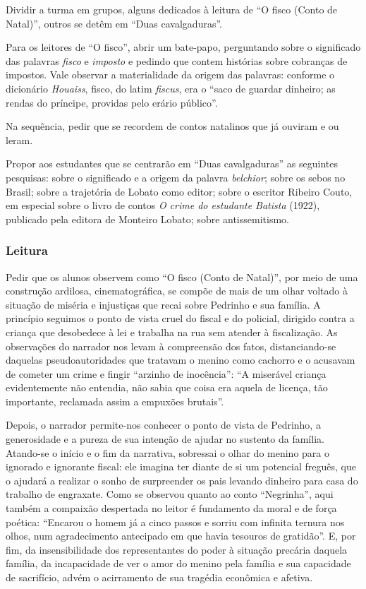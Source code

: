\documentclass[11pt]{extarticle}
\begin{document}
Dividir a turma em grupos, alguns dedicados à leitura de ``O fisco
(Conto de Natal)'', outros se detêm em ``Duas cavalgaduras''.

Para os leitores de ``O fisco'', abrir um bate-papo, perguntando sobre o
significado das palavras \emph{fisco} e \emph{imposto} e pedindo que
contem histórias sobre cobranças de impostos. Vale observar a
materialidade da origem das palavras: conforme o dicionário
\emph{Houaiss}, fisco, do latim \emph{fiscus}, era o ``saco de guardar
dinheiro; as rendas do príncipe, providas pelo erário público''.

Na sequência, pedir que se recordem de contos natalinos que já ouviram e
ou leram.

Propor aos estudantes que se centrarão em ``Duas cavalgaduras'' as
seguintes pesquisas: sobre o significado e a origem da palavra
\emph{belchior}; sobre os sebos no Brasil; sobre a trajetória de Lobato
como editor; sobre o escritor Ribeiro Couto, em especial sobre o livro
de contos \emph{O crime do estudante Batista} (1922), publicado pela
editora de Monteiro Lobato; sobre antissemitismo.

\subsubsection{Leitura}


Pedir que os alunos observem como ``O fisco (Conto de Natal)'', por meio
de uma construção ardilosa, cinematográfica, se compõe de mais de um
olhar voltado à situação de miséria e injustiças que recai sobre
Pedrinho e sua família. A princípio seguimos o ponto de vista cruel do
fiscal e do policial, dirigido contra a criança que desobedece à lei e
trabalha na rua sem atender à fiscalização. As observações do narrador
nos levam à compreensão dos fatos, distanciando-se daquelas
pseudoautoridades que tratavam o menino como cachorro e o acusavam de
cometer um crime e fingir ``arzinho de inocência'': ``A miserável
criança evidentemente não entendia, não sabia que coisa era aquela de
licença, tão importante, reclamada assim a empuxões brutais''.

Depois, o narrador permite-nos conhecer o ponto de vista de Pedrinho, a
generosidade e a pureza de sua intenção de ajudar no sustento da
família. Atando-se o início e o fim da narrativa, sobressai o olhar do
menino para o ignorado e ignorante fiscal: ele imagina ter diante de si
um potencial freguês, que o ajudará a realizar o sonho de surpreender os
pais levando dinheiro para casa do trabalho de engraxate. Como se
observou quanto ao conto ``Negrinha'', aqui também a compaixão
despertada no leitor é fundamento da moral e de força poética: ``Encarou
o homem já a cinco passos e sorriu com infinita ternura nos olhos, num
agradecimento antecipado em que havia tesouros de gratidão''. E, por
fim, da insensibilidade dos representantes do poder à situação precária
daquela família, da incapacidade de ver o amor do menino pela família e
sua capacidade de sacrifício, advém o acirramento de sua tragédia
econômica e afetiva.
\end{document}
